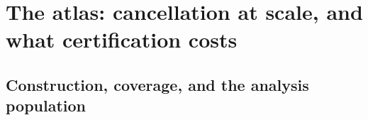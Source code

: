 %
%
%
%
%

\section{The atlas: cancellation at scale, and what certification costs}

\label{sec:atlas}

\subsection{Construction, coverage, and the analysis population}
\label{sec:atlas:construction}

